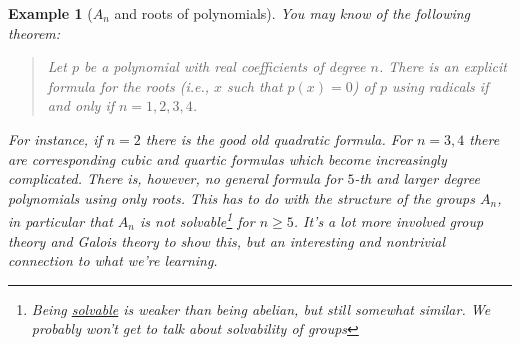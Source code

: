 \documentclass[12pt]{article}
\numberwithin{equation}{subsection}
\theoremstyle{note}
\newtheorem{example}[subsection]{Example}
\begin{document}
	\begin{example}[$A_n$ and roots of polynomials] You may know of the following theorem: 
	
	\begin{quote}\textit{Let $p$ be a polynomial with real coefficients of degree $n$. There is an explicit formula for the roots (i.e., $x$ such that $p(x)=0$) of $p$ using radicals if and only if $n=1,2,3,4$}. \end{quote}
	
	For instance, if $n=2$ there is the good old quadratic formula. For $n=3,4$ there are corresponding cubic and quartic formulas which become increasingly complicated. There is, however, no general formula for $5$-th and larger degree polynomials using only roots. This has to do with the structure of the groups $A_n$, in particular that $A_n$ is not \textit{solvable}\footnote{Being \href{https://en.wikipedia.org/wiki/Solvable_group}{solvable} is weaker than being abelian, but still somewhat similar. We probably won't get to talk about solvability of groups} for $n\geq 5$. It's a lot more involved group theory and Galois theory to show this, but an interesting and nontrivial connection to what we're learning. \end{example}
\end{document}
